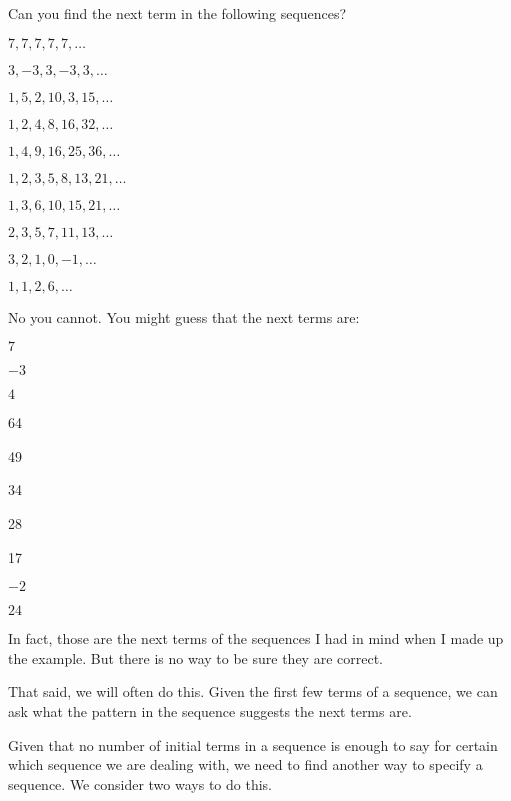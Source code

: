 \documentclass[12pt]{article}
\begin{document}
\begin{example}
Can you find the next term in the following sequences?
\begin{enumerate}


\begin{multicols}{2}
		\item $7,7,7,7,7, \ldots$
		\item $3, -3, 3, -3, 3, \ldots$
		\item $1, 5, 2, 10, 3, 15, \ldots$
		\item $1, 2, 4, 8, 16, 32, \ldots$
		\item $1, 4, 9, 16, 25, 36, \ldots$
		\item $1, 2, 3, 5, 8, 13, 21, \ldots$
		\item $1, 3, 6, 10, 15, 21, \ldots$
		\item $2, 3, 5, 7, 11, 13, \ldots$
		\item $3, 2, 1, 0, -1, \ldots$
		\item $1, 1, 2, 6, \ldots$
		\end{multicols}
	\end{enumerate}
	\begin{solution}
	 No you cannot.  You might guess that the next terms are:
	 \begin{enumerate}
	  \begin{multicols}{4}
	  \item $7$
	  \item $-3$
	  		\item $4$
		\item 64
		\item 49
		\item 34
		\item 28
		\item 17
		\item $-2$
		\item $24$
	  \end{multicols}

	 \end{enumerate}
	 In fact, those are the next terms of the sequences I had in mind when I made up the example.  But there is no way to be sure they are correct.

	 That said, we will often do this.  Given the first few terms of a sequence, we can ask what the pattern in the sequence suggests the next terms are.
	\end{solution}

\end{example}

Given that no number of initial terms in a sequence is enough to say for certain which sequence we are dealing with, we need to find another way to specify a sequence.  We consider two ways to do this.
\end{document}
